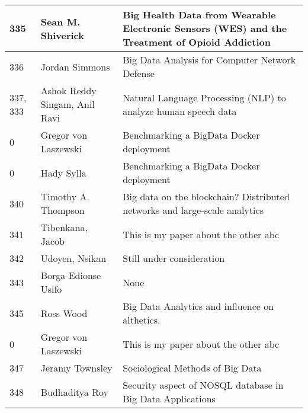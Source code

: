 \documentclass[12pt]{book}
\begin{document}
\begin{footnotesize}
\begin{longtable}{|p{1cm}p{5cm}p{9cm}|}
\hline
335 & Sean M. Shiverick & Big Health Data from Wearable Electronic Sensors (WES) and the Treatment of Opioid Addiction
  \\
\hline
336 & Jordan Simmons & Big Data Analysis for Computer Network Defense  \\
\hline
337, 333 & Ashok Reddy Singam, Anil Ravi & Natural Language Processing (NLP) to analyze human speech data  \\
\hline
0 & Gregor von Laszewski & Benchmarking a BigData Docker deployment  \\
\hline
0 & Hady Sylla & Benchmarking a BigData Docker deployment  \\
\hline
340 & Timothy A. Thompson & Big data on the blockchain? Distributed networks and large-scale analytics  \\
\hline
341 & Tibenkana, Jacob & This is my paper about the other abc  \\
\hline
342 & Udoyen, Nsikan & Still under consideration  \\
\hline
343 & Borga Edionse Usifo & None  \\
\hline
345 & Ross Wood & Big Data Analytics and influence on althetics.  \\
\hline
0 & Gregor von Laszewski & This is my paper about the other abc  \\
\hline
347 & Jeramy Townsley & Sociological Methods of Big Data  \\
\hline
348 & Budhaditya Roy & Security aspect of NOSQL database in Big Data Applications  \\
\hline
\end{longtable}
\end{footnotesize}
\newpage
\end{document}
